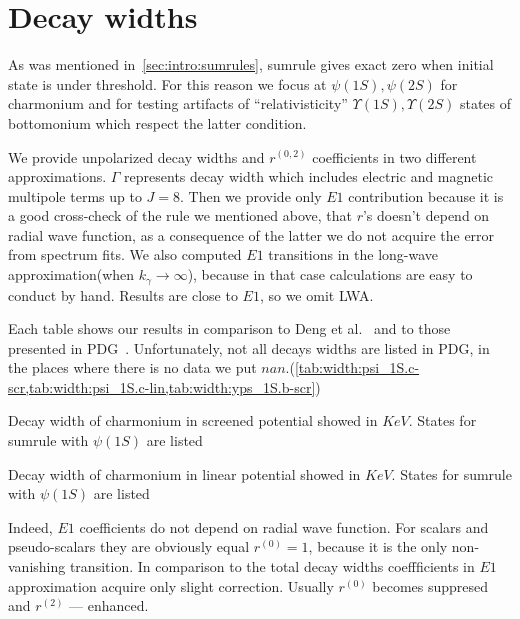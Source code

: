 \chapter{Decay widths}

As was mentioned in~\cref{sec:intro:sumrules}, sumrule gives exact zero when initial state is under threshold. For this reason we focus at $\psi(1S),\psi(2S)$ for charmonium and for testing artifacts of ``relativisticity'' $\Upsilon(1S),\Upsilon(2S)$ states of bottomonium which respect the latter condition.

We provide unpolarized decay widths and $r^{(0,2)}$ coefficients in two different approximations. $\Gamma$ represents decay width which includes electric and magnetic multipole terms up to $J=8$. Then we provide only $E1$ contribution because it is a good cross-check of the rule we mentioned above, that $r$'s doesn't depend on radial wave function, as a consequence of the latter we do not acquire the error from spectrum fits. We also computed $E1$ transitions in the long-wave approximation(when $k_\gamma \rightarrow \infty$), because in that case calculations are easy to conduct by hand. Results are close to $E1$, so we omit LWA.

Each table shows our results in comparison to Deng et al.~\cite{deng-charm,deng-bot} and to those presented in PDG~\cite{pdg}. Unfortunately, not all decays widths are listed in PDG, in the places where there is no data we put $nan$.(\cref{tab:width:psi_1S.c-scr,tab:width:psi_1S.c-lin,tab:width:yps_1S.b-scr})

\begin{table}[H]
    \centering
    \caption{Decay width of charmonium in screened potential showed in $KeV$. States for sumrule with $\psi(1S)$ are listed \label{tab:width:psi_1S.c-scr}}
    \begin{small}
        
    \end{small}
\end{table}

\begin{table}[H]
    \centering
    \caption{Decay width of charmonium in linear potential showed in $KeV$. States for sumrule with $\psi(1S)$ are listed \label{tab:width:psi_1S.c-lin}}
    \begin{small}
        
    \end{small}
\end{table}

Indeed, $E1$ coefficients do not depend on radial wave function. For scalars and pseudo-scalars they are obviously equal $r^{(0)}=1$, because it is the only non-vanishing transition. In comparison to the total decay widths coeffficients in $E1$ approximation acquire only slight correction. Usually $r^{(0)}$ becomes suppresed and $r^{(2)}$ --- enhanced.

